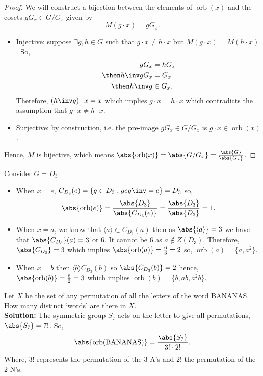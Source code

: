 \documentclass[12pt, a4paper]{article}
\DeclareMathOperator{\orb}{orb}
\begin{document}
\begin{proof}
    We will construct a bijection between the elements of \(\orb(x)\) and the cosets \(gG_x \in G/G_x\) given by
    \[M(g\cdot x)=gG_x.\]
    \begin{itemize}
        \item Injective: suppose \(\exists g,h \in G\) such that \(g \cdot x \neq h \cdot x\) but \(M(g\cdot x) = M(h\cdot x)\). So,
        \[\begin{aligned}
            gG_x &= hG_x \\
            \then h\inv gG_x &= G_x \\
            \then h\inv g &\in G_x.
        \end{aligned}\]
        Therefore, \((h\inv g) \cdot x =x\) which implies \(g \cdot x =h \cdot x\) which contradicts the assumption that \(g \cdot x \neq h \cdot x\).
        \item Surjective: by construction, i.e. the pre-image \(gG_x \in G / G_x\) is \(g \cdot x \in \orb(x)\).
    \end{itemize}
    Hence, \(M\) is bijective, which means \(\abs{\orb(x)}=\abs{G/G_x}=\frac{\abs{G}}{\abs{G_x}}\).
\end{proof}

\begin{mdexample}
    Consider \(G=D_3\):
    \begin{itemize}
        \item When \(x=e\), \(C_{D_3}(e)=\{g \in D_3 : geg\inv =e\}=D_3\) so,
        \[\abs{\orb(e)} =\frac{\abs{D_3}}{\abs{C_{D_3}(e)}}=\frac{\abs{D_3}}{\abs{D_3}}=1.\]
        \item When \(x=a\), we know that \(\langle a \rangle \subset C_{D_3}(a)\) then as \(\abs{\langle a \rangle}=3\) we have that \(\abs{C_{D_3}}(a)=3\) or \(6\). It cannot be \(6\) as \(a \notin Z(D_3)\). Therefore, \(\abs{C_{D_3}}=3\) which implies \(\abs{\orb(a)}=\frac{6}{3}=2\) so, \(\orb(a)=\{a,a^2\}\).
        \item When \(x=b\) then \(\langle b \rangle C_{D_3}(b)\) so \(\abs{C_{D_3}(b)}=2\) hence, \(\abs{\orb(b)}=\frac{6}{2}=3\) which implies \(\orb(b)=\{b,ab,a^2b\}\).
    \end{itemize}
\end{mdexample}

\begin{example}
    Let \(X\) be the set of any permutation of all the letters of the word BANANAS. How many distinct `words' are there in \(X\). \\
    \textbf{Solution:} The symmetric group \(S_7\) acts on the letter to give all permutations, \(\abs{S_7}=7!\). So, 
    \[\abs{\orb(\text{BANANAS})}=\frac{\abs{S_7}}{3! \cdot 2!}.\]
    Where, \(3!\) represents the permutation of the \(3\) A's and \(2!\) the permutation of the \(2\) N's.
\end{example}
\end{document}
